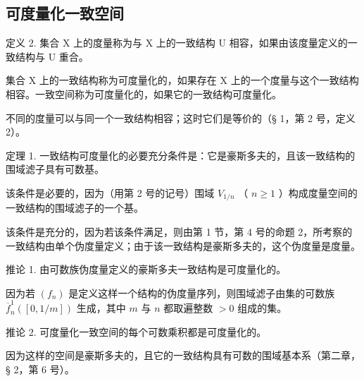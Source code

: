 \subsection{可度量化一致空间}

定义 2. 集合 X 上的度量称为与 X 上的一致结构 U 相容，如果由该度量定义的一致结构与 U 重合。

集合 X 上的一致结构称为可度量化的，如果存在 X 上的一个度量与这个一致结构相容。一致空间称为可度量化的，如果它的一致结构可度量化。

不同的度量可以与同一个一致结构相容；这时它们是等价的（§ 1，第 2 号，定义 2）。

定理 1. 一致结构可度量化的必要充分条件是：它是豪斯多夫的，且该一致结构的围域滤子具有可数基。

该条件是必要的，因为（用第 2 号的记号）围域 \(V_{1/n}\) （ \(n \geqslant 1\) ）构成度量空间的一致结构的围域滤子的一个基。

该条件是充分的，因为若该条件满足，则由第 1 节，第 4 号的命题 2，所考察的一致结构由单个伪度量定义；由于该一致结构是豪斯多夫的，这个伪度量是度量。

推论 1. 由可数族伪度量定义的豪斯多夫一致结构是可度量化的。

因为若 \((f_n)\) 是定义这样一个结构的伪度量序列，则围域滤子由集的可数族 \(\overline{f}_n^1([0, 1/m])\) 生成，其中 \(m\) 与 \(n\) 都取遍整数 \(>0\) 组成的集。

推论 2. 可度量化一致空间的每个可数乘积都是可度量化的。

因为这样的空间是豪斯多夫的，且它的一致结构具有可数的围域基本系（第二章，§ 2，第 6 号）。

